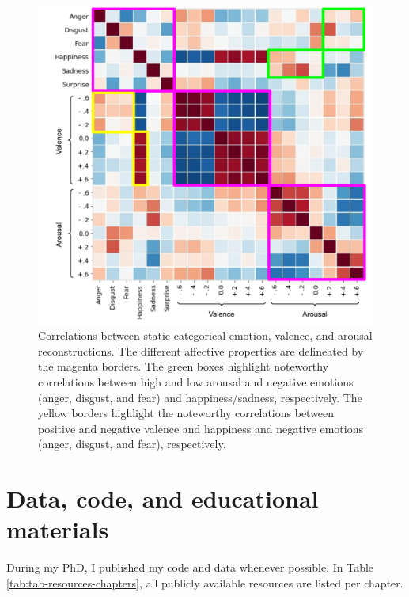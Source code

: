 \documentclass[11pt,american,a4paper,oneside,]{memoir} %
\begin{document}
\begin{figure}
\centering
\includegraphics{_bookdown_files/static-vs-dynamic-files/figures/figure_S9.pdf}
\caption{\label{fig:fig-svsd-S9}Correlations between static categorical emotion, valence, and arousal reconstructions. The different affective properties are delineated by the magenta borders. The green boxes highlight noteworthy correlations between high and low arousal and negative emotions (anger, disgust, and fear) and happiness/sadness, respectively. The yellow borders highlight the noteworthy correlations between positive and negative valence and happiness and negative emotions (anger, disgust, and fear), respectively.}
\end{figure}



\hypertarget{resources-supplement}{%
\chapter{Data, code, and educational materials}\label{resources-supplement}}

During my PhD, I published my code and data whenever possible. In Table \ref{tab:tab-resources-chapters}, all publicly available resources are listed per chapter.

\begingroup\fontsize{8}{10}\selectfont
\end{document}
